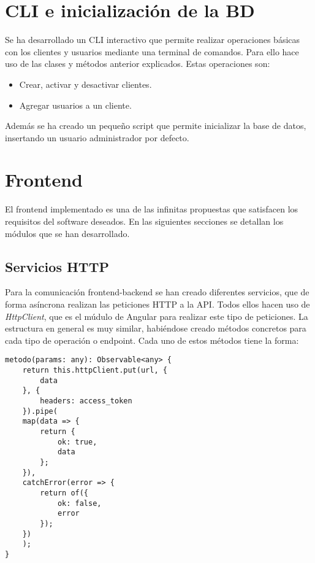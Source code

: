 \section{CLI e inicialización de la BD}


Se ha desarrollado un CLI interactivo que permite realizar operaciones básicas con los clientes y usuarios mediante una terminal de comandos. Para ello hace uso de las clases y métodos anterior explicados. Estas operaciones son:
\begin{itemize}
	\item Crear, activar y desactivar clientes.
	\item Agregar usuarios a un cliente.
\end{itemize}


Además se ha creado un pequeño script que permite inicializar la base de datos, insertando un usuario administrador por defecto.





\section{Frontend}

El frontend implementado es una de las infinitas propuestas que satisfacen los requisitos del software deseados. En las siguientes secciones se detallan los módulos que se han desarrollado.



\subsection{Servicios HTTP}


Para la comunicación frontend-backend se han creado diferentes servicios, que de forma asíncrona realizan las peticiones HTTP a la API. Todos ellos hacen uso de \textit{HttpClient}, que es el múdulo de Angular para realizar este tipo de peticiones. La estructura en general es muy similar, habiéndose creado métodos concretos para cada tipo de operación o endpoint. Cada uno de estos métodos tiene la forma:

\begin{lstlisting}
metodo(params: any): Observable<any> {
	return this.httpClient.put(url, {
		data
	}, {
		headers: access_token
	}).pipe(
	map(data => {
		return {
			ok: true,
			data
		};
	}),
	catchError(error => {
		return of({
			ok: false,
			error
		});
	})
	);
}
\end{lstlisting}

